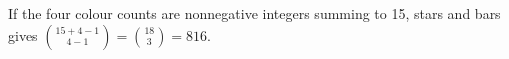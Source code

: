 If the four colour counts are nonnegative integers summing to 15, stars and bars gives $\binom{15+4-1}{4-1}=\binom{18}{3}=\boxed{816}$.
